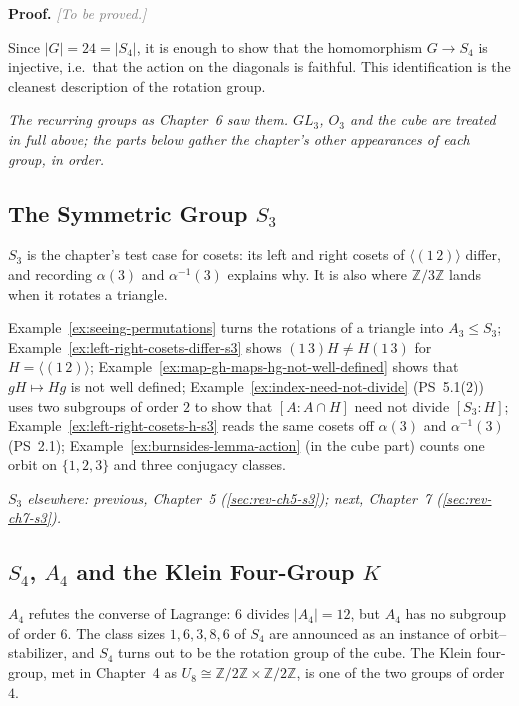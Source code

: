 \documentclass[11pt]{report}
\newcommand{\proofpending}{\noindent\textbf{Proof.} \textcolor{gray}{\textit{[To be proved.]}}\par\vspace{5pt}}
\begin{document}
\proofpending

\begin{rembox}\label{rem:cleanest-description}
Since $|G| = 24 = |S_4|$, it is enough to show that the homomorphism $G \to S_4$ is injective, i.e.\ that the action on the diagonals is faithful. This identification is the cleanest description of the rotation group.
\end{rembox}

\label{sec:rev-ch6}
\textit{The recurring groups as Chapter~6 saw them. $GL_3$, $O_3$ and the cube are treated in full above; the parts below gather the chapter's other appearances of each group, in order.}

\subsection{\texorpdfstring{The Symmetric Group $S_3$}{The Symmetric Group S₃}}\label{sec:rev-ch6-s3}

$S_3$ is the chapter's test case for cosets: its left and right cosets of $\langle (1\,2) \rangle$ differ, and recording $\alpha(3)$ and $\alpha^{-1}(3)$ explains why. It is also where $\mathbb{Z}/3\mathbb{Z}$ lands when it rotates a triangle.

Example~\ref{ex:seeing-permutations} turns the rotations of a triangle into $A_3 \leq S_3$; Example~\ref{ex:left-right-cosets-differ-s3} shows $(1\,3)H \neq H(1\,3)$ for $H = \langle (1\,2) \rangle$; Example~\ref{ex:map-gh-maps-hg-not-well-defined} shows that $gH \mapsto Hg$ is not well defined; Example~\ref{ex:index-need-not-divide} (PS~5.1(2)) uses two subgroups of order $2$ to show that $[A : A \cap H]$ need not divide $[S_3 : H]$; Example~\ref{ex:left-right-cosets-h-s3} reads the same cosets off $\alpha(3)$ and $\alpha^{-1}(3)$ (PS~2.1); Example~\ref{ex:burnsides-lemma-action} (in the cube part) counts one orbit on $\{1, 2, 3\}$ and three conjugacy classes.

\textit{$S_3$ elsewhere: previous, Chapter~5 (\ref{sec:rev-ch5-s3}); next, Chapter~7 (\ref{sec:rev-ch7-s3}).}

\subsection{\texorpdfstring{$S_4$, $A_4$ and the Klein Four-Group $K$}{S₄, A₄ and the Klein Four-Group K}}\label{sec:rev-ch6-s4}

$A_4$ refutes the converse of Lagrange: $6$ divides $|A_4| = 12$, but $A_4$ has no subgroup of order $6$. The class sizes $1, 6, 3, 8, 6$ of $S_4$ are announced as an instance of orbit--stabilizer, and $S_4$ turns out to be the rotation group of the cube. The Klein four-group, met in Chapter~4 as $U_8 \cong \mathbb{Z}/2\mathbb{Z} \times \mathbb{Z}/2\mathbb{Z}$, is one of the two groups of order $4$.
\end{document}
